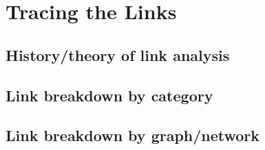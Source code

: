 \chapter{Tracing the Links}

\section{History/theory of link analysis}

\section{Link breakdown by category}

\section{Link breakdown by graph/network}








